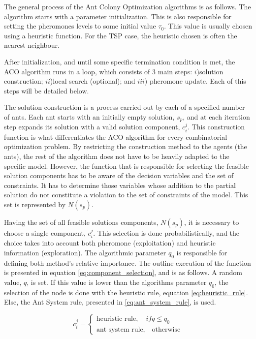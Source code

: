 The general process of the Ant Colony Optimization algorithms is as follows. The algorithm starts with a parameter initialization. This is also responsible for setting the pheromones levels to some initial value $\tau_{0}$.
This value is usually chosen using a heuristic function. For the TSP case, the heuristic chosen is often the nearest neighbour.

After initialization, and until some specific termination condition is met, the ACO algorithm runs in a loop, which consists of 3 main steps: $i$)solution construction; $ii$)local search (optional); and $iii$) pheromone update. Each of this steps will be detailed below.

The solution construction is a process carried out by each of a specified number of ants. Each ant starts with an initially empty solution, $s_{p}$, and at each iteration step expands its solution with a valid solution component, $c_{i}^{j}$. This construction function is what differentiates the ACO algorithm for every combinatorial optimization problem. By restricting the construction method to the agents (the ants), the rest of the algorithm does not have to be heavily adapted to the specific model. However, the function that is responsible for selecting the feasible solution components has to be aware of the decision variables and the set of constraints. It has to determine those variables whose addition to the partial solution do not constitute a violation to the set of constraints of the model. This set is represented by $N(s_{p})$.

Having the set of all feasible solutions components, $N(s_{p})$, it is necessary to choose a single component, $c_{i}^{j}$. This selection is done probabilistically, and the choice takes into account both pheromone (exploitation) and heuristic information (exploration). The algorithmic parameter $q_{0}$ is responsible for defining both method's relative importance. The outline execution of the function is presented in equation \ref{eq:component_selection}, and is as follows. A random value, $q$, is set. If this value is lower than the algorithms parameter $q_{0}$, the selection of the node is done with the heuristic rule, equation \ref{eq:heuristic_rule}. Else, the Ant System rule, presented in \ref{eq:ant_system_rule}, is used.

\begin{equation} \label{eq:component_selection}
	c_{i}^{j} =
		\begin{cases}
			\textrm{heuristic rule}, \quad if q \leq q_{0} \\
			\textrm{ant system rule,} \quad \textrm{otherwise}
		\end{cases}
\end{equation}

